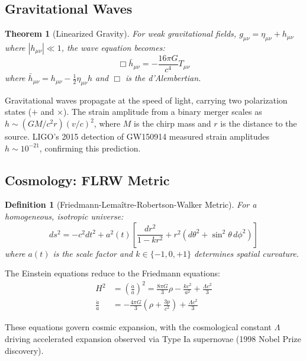 \documentclass[a4paper, 11pt]{article}
\newtheorem{definition}{Definition}[section]
\newtheorem{theorem}{Theorem}[section]
\begin{document}
\subsection{Gravitational Waves}

\begin{theorem}[Linearized Gravity]
For weak gravitational fields, $g_{\mu\nu} = \eta_{\mu\nu} + h_{\mu\nu}$ where $|h_{\mu\nu}| \ll 1$,
the wave equation becomes:
\begin{equation}
\Box \bar{h}_{\mu\nu} = -\frac{16\pi G}{c^4}T_{\mu\nu}
\end{equation}
where $\bar{h}_{\mu\nu} = h_{\mu\nu} - \frac{1}{2}\eta_{\mu\nu}h$ and $\Box$ is the d'Alembertian.
\end{theorem}

Gravitational waves propagate at the speed of light, carrying two polarization states ($+$ and $\times$).
The strain amplitude from a binary merger scales as $h \sim (GM/c^2r)(v/c)^2$, where $M$ is the
chirp mass and $r$ is the distance to the source. LIGO's 2015 detection of GW150914 measured
strain amplitudes $h \sim 10^{-21}$, confirming this prediction.

\subsection{Cosmology: FLRW Metric}

\begin{definition}[Friedmann-Lema\^{i}tre-Robertson-Walker Metric]
For a homogeneous, isotropic universe:
\begin{equation}
ds^2 = -c^2dt^2 + a^2(t)\left[\frac{dr^2}{1-kr^2} + r^2(d\theta^2 + \sin^2\theta\,d\phi^2)\right]
\end{equation}
where $a(t)$ is the scale factor and $k \in \{-1, 0, +1\}$ determines spatial curvature.
\end{definition}

The Einstein equations reduce to the Friedmann equations:
\begin{align}
H^2 &= \left(\frac{\dot{a}}{a}\right)^2 = \frac{8\pi G}{3}\rho - \frac{kc^2}{a^2} + \frac{\Lambda c^2}{3} \\
\frac{\ddot{a}}{a} &= -\frac{4\pi G}{3}\left(\rho + \frac{3p}{c^2}\right) + \frac{\Lambda c^2}{3}
\end{align}

These equations govern cosmic expansion, with the cosmological constant $\Lambda$ driving
accelerated expansion observed via Type Ia supernovae (1998 Nobel Prize discovery).
\end{document}
